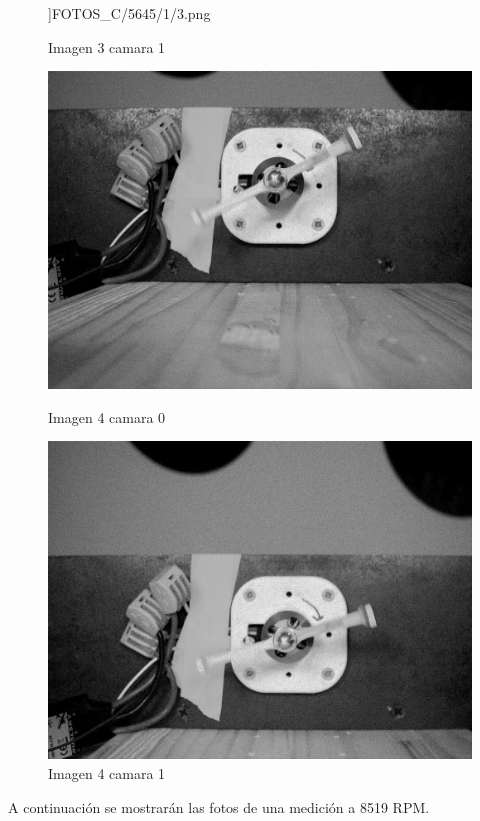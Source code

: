\documentclass{article}
\begin{document}
\begin{figure}[H]
\begin{minipage}[b]{0.45\textwidth}
      \textwidth]{FOTOS_C/5645/1/3.png}
      \caption{Imagen 3 camara 1}
    \end{minipage}
    \begin{minipage}[b]{0.45\textwidth}
      \centering
      \includegraphics[width=0.8
      \textwidth]{FOTOS_C/5645/0/4.png}
      \caption{Imagen 4 camara 0}
    \end{minipage}
    \begin{minipage}[b]{0.45\textwidth}
      \centering
      \includegraphics[width=0.8
      \textwidth]{FOTOS_C/5645/1/4.png}
      \caption{Imagen 4 camara 1}
    \end{minipage}
\end{figure}

\newpage
\noindent A continuación se mostrarán las fotos de una medición a 8519 RPM.
\end{document}
